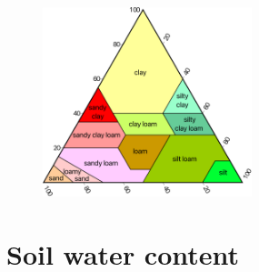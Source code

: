 \begin{frame}
	\frametitle{\secname}
	\begin{minipage}{0.47\textwidth}
		\begin{figure}[ht!]
			\centering
			\includegraphics[height=5.5cm]{textural_soil}
		\end{figure}
	\end{minipage}
	\begin{minipage}{0.5\textwidth}
		
	\end{minipage}
\end{frame}

\section{Soil water content} %

